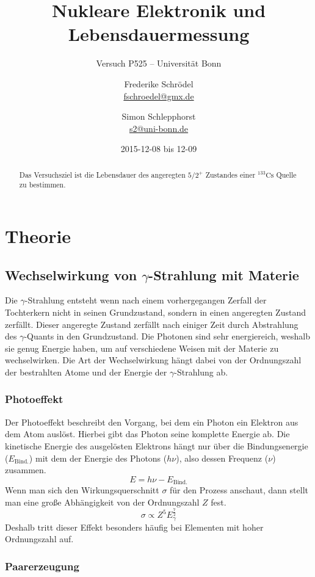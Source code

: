 \documentclass[11pt, ngerman, fleqn, DIV=15, headinclude, BCOR=2cm]{scrreprt}
\title{Nukleare Elektronik und Lebensdauermessung}
\subtitle{Versuch P525 -- Universität Bonn}
\author{
	Frederike Schrödel \\
	\small{\href{mailto:fschroedel@gmx.de}{fschroedel@gmx.de}}
	\and
	Simon Schlepphorst \\
	\small{\href{mailto:s2@uni-bonn.de}{s2@uni-bonn.de}}
}
\date{2015-12-08 bis 12-09}
\begin{document}
\maketitle

\begin{abstract}
	Das Versuchsziel ist die Lebensdauer des angeregten $5/2^+$
        Zustandes einer $^{133}\text{Cs}$ Quelle zu bestimmen.
\end{abstract}


\tableofcontents

\chapter{Theorie}

\section{Wechselwirkung von $\gamma$-Strahlung mit Materie}
Die $\gamma$-Strahlung entsteht wenn nach einem vorhergegangen Zerfall der
Tochterkern nicht in seinen Grundzustand, sondern in einen angeregten Zustand
zerfällt.
Dieser angeregte Zustand zerfällt nach einiger Zeit durch Abstrahlung des
$\gamma$-Quants in den Grundzustand. Die Photonen sind sehr energiereich,
weshalb sie genug Energie haben, um auf verschiedene Weisen mit der Materie zu
wechselwirken.
Die Art der Wechselwirkung hängt dabei von der Ordnungszahl der bestrahlten Atome
und der Energie der $\gamma$-Strahlung ab.

\subsection{Photoeffekt}
Der Photoeffekt beschreibt den Vorgang, bei dem ein Photon ein Elektron aus
dem Atom auslöst.
Hierbei gibt das Photon seine komplette Energie ab.
Die kinetische Energie des ausgelösten Elektrons hängt nur über die
Bindungsenergie ($E_\text{Bind.}$) mit dem der Energie des Photons ($h\nu$),
also dessen Frequenz ($\nu$) zusammen.
\[ 
    E = h\nu - E_\text{Bind.}
\]
Wenn man sich den Wirkungsquerschnitt $\sigma$ für den Prozess anschaut,
dann stellt man eine große Abhängigkeit von der Ordnungszahl $Z$ fest.
\[
    \sigma \propto Z^5 E_\gamma^{\frac 72}
\]
Deshalb tritt dieser Effekt besonders häufig bei Elementen mit hoher Ordnungszahl
auf.

\subsection{Paarerzeugung}
\end{document}
